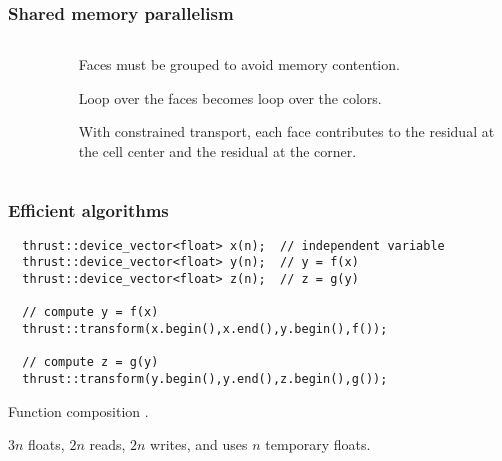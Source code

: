 \documentclass{beamer}
\begin{document}
\begin{frame}[fragile]
\frametitle{Shared memory parallelism}
\begin{columns}
\begin{column}{0.5\textwidth}
\begin{figure}[htbp]
\end{figure}
\end{column}
\begin{column}{0.5\textwidth}
\bei
\item Faces must be grouped to avoid memory contention.
\item Loop over the faces becomes loop over the colors.
\pause
\item With constrained transport, each face contributes to the residual at the cell center and the residual at the corner.
\ebi
\end{column}
\end{columns}
\end{frame}

\begin{frame}[fragile]
\frametitle{Efficient algorithms}

\begin{lstlisting}
  thrust::device_vector<float> x(n);  // independent variable
  thrust::device_vector<float> y(n);  // y = f(x)
  thrust::device_vector<float> z(n);  // z = g(y)

  // compute y = f(x)
  thrust::transform(x.begin(),x.end(),y.begin(),f());

  // compute z = g(y) 
  thrust::transform(y.begin(),y.end(),z.begin(),g());
\end{lstlisting} 
\bei
\item Function composition \citep{Thrust}.
\item $3n$ floats, $2n$ reads, $2n$ writes, and uses $n$ temporary floats.
\ebi
\end{frame}
\end{document}
